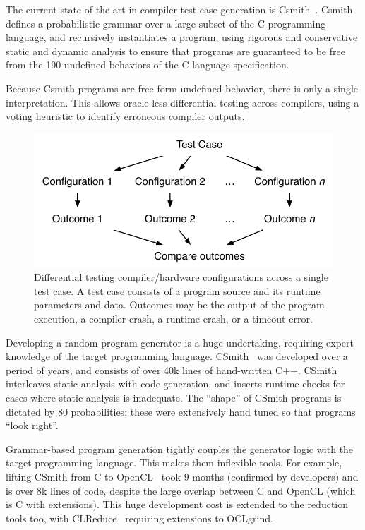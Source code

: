 The current state of the art in compiler test case generation is Csmith~\cite{Yang2011}. Csmith defines a probabilistic grammar over a large subset of the C programming language, and recursively instantiates a program, using rigorous and conservative static and dynamic analysis to ensure that programs are guaranteed to be free from the 190 undefined behaviors of the C language specification.

Because Csmith programs are free form undefined behavior, there is only a single interpretation. This allows oracle-less differential testing across compilers, using a voting heuristic to identify erroneous compiler outputs.

\begin{figure}
	\centering
	\includegraphics[width=.85\columnwidth]{img/difftest} %
	\caption{%
		Differential testing compiler/hardware configurations across a single test case. A test case consists of a program source and its runtime parameters and data. Outcomes may be the output of the program execution, a compiler crash, a runtime crash, or a timeout error.%
	}%
	\label{fig:difftest}
\end{figure}

Developing a random program generator is a huge undertaking, requiring expert knowledge of the target programming language. CSmith~\cite{Yang2011} was developed over a period of years, and consists of over 40k lines of hand-written C++. CSmith interleaves static analysis with code generation, and inserts runtime checks for cases where static analysis is inadequate. The ``shape'' of CSmith programs is dictated by 80 probabilities; these were extensively hand tuned so that programs ``look right''.

Grammar-based program generation tightly couples the generator logic with the target programming language. This makes them inflexible tools. For example, lifting CSmith from C to OpenCL~\cite{Lidbury2015a} took 9 months (confirmed by developers) and is over 8k lines of code, despite the large overlap between C and OpenCL (which is C with extensions). This huge development cost is extended to the reduction tools too, with CLReduce~\cite{Pflanzer2016} requiring extensions to OCLgrind.

